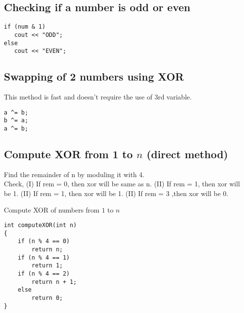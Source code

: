 \documentclass[twoside,12pt,a4paper,english]{book}
\theoremstyle{definition}
\theoremstyle{problemstyle}
\theoremstyle{problemstyle}
\theoremstyle{problemstyle}
\begin{document}
\subsection{Checking if a number is odd or even}
\begin{lstlisting}
if (num & 1)
   cout << "ODD";
else
   cout << "EVEN";
\end{lstlisting}
\subsection{Swapping of 2 numbers using XOR}
This method is fast and doesn’t require the use of 3rd variable.
\begin{lstlisting}
a ^= b;
b ^= a;
a ^= b;
\end{lstlisting}
\newpage
\subsection{Compute XOR from 1 to \texorpdfstring{$n$}{n} (direct method)}
\begin{algorithm}
Find the remainder of n by moduling it with 4.\\
Check, \linebreak
 (I) If rem = 0, then xor will be same as n.
\linebreak
(II) If rem = 1, then xor will be 1.
\linebreak
(II) If rem = 1, then xor will be 1.
\linebreak
(II) If rem = 3 ,then xor will be 0.
\caption{Compute XOR of numbers from $1$ to $n$}
\label{algo:b}
\end{algorithm}
\begin{lstlisting}
int computeXOR(int n)
{
    if (n % 4 == 0)
        return n;
    if (n % 4 == 1)
        return 1;
    if (n % 4 == 2)
        return n + 1;
    else
        return 0;
}
\end{lstlisting}
\end{document}
